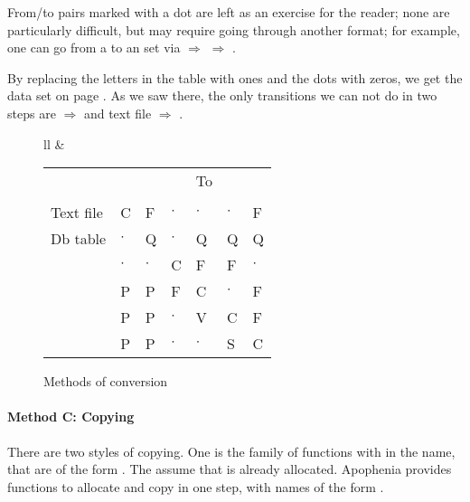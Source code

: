 From/to pairs marked with a dot are
left as an exercise for the reader; none are particularly difficult, but
may require going through another format; for example, one can go from a
 to an  set via  $\Rightarrow$  $\Rightarrow$ .

By replacing the letters in the table with ones and the dots with
zeros, we get the data set on page \pageref{twostep}. As we saw there, the
only transitions we can not do in two steps are 
$\Rightarrow$  and text file $\Rightarrow$
.

\def\rcap#1{\rotatebox{45}{#1}\hskip -15pt }
\def\rcapc#1{\rotatebox{45}{\cinline{#1}}\hskip -15pt }
\def\cd{$\cdot$}
\begin{figure} \begin{center}
\begin{tabular}{ll}
&
\begin{tabular}{lp{0.4cm}p{0.4cm}p{0.4cm}p{0.4cm}p{0.4cm}p{0.4cm}}
   &   &&&To\\
    & \rcap{Text file} & \rcap{Db table} & \rcapc{double[]} 
        & \rcapc{gsl\_vector} & \rcapc{gsl\_matrix}& \rcapc{apop\_data}\\
Text file               & C & F & \cd & \cd & \cd &  F                   \\
Db table                & \cd & Q & \cd & Q & Q & Q                  \\
\cinline{double[ ]}      & \cd & \cd & C & F & F & \cd                  \\
\cinline{gsl\_vector}   & P  & P & F & C & \cd & F                    \\
\cinline{gsl\_matrix}   &  P & P & \cd & V &C &  F               \\
\cinline{apop\_data}    & P & P & \cd & \cd & S &C
\end{tabular}
\end{tabular}
\caption{Methods of conversion} \label{conversiontab}
\end{center}\end{figure} 


\paragraph{Method C: Copying} There are two styles of copying.
One is the family of functions with  in the name, that are
of the form . The assume that 
is already allocated.  
Apophenia provides functions to allocate and copy in one step, with
names of the form .

